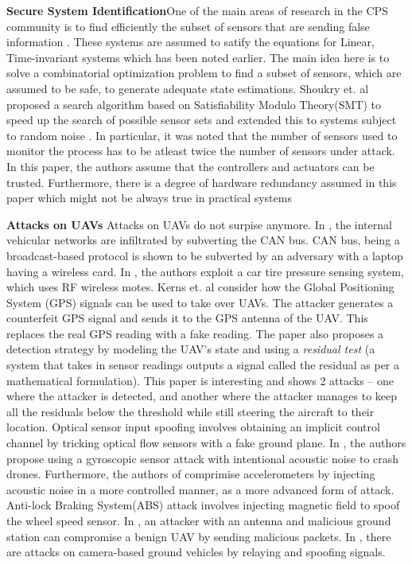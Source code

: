 \textbf{Secure System Identification}One of the main areas of research in the CPS community is to find efficiently the subset of sensors that are sending false information \cite{}. These systems are assumed to satify the equations for Linear, Time-invariant systems which has been noted earlier. The main idea here is to solve a combinatorial optimization problem to find a subset of sensors, which are assumed to be safe, to generate adequate state estimations. Shoukry et. al \cite{} proposed a search algorithm based on Satisfiability Modulo Theory(SMT) to speed up the search of possible sensor sets and extended this to systems subject to random noise \cite{}. In particular, it was noted that the number of sensors used to monitor the process has to be atleast twice the number of sensors under attack. In this paper, the authors  assume that the controllers and actuators can be trusted. Furthermore, there is a degree of hardware redundancy assumed in this paper which might not be always true in practical systems

\textbf{Attacks on UAVs} Attacks on UAVs do not surpise anymore. In \cite{}, the internal vehicular networks are infiltrated by subverting the CAN bus. CAN bus, being a broadcast-based protocol is shown to be subverted by an adversary with a laptop having a wireless card. In \cite{}, the authors exploit a car tire pressure sensing system, which uses RF wireless motes. Kerns et. al \cite{} consider how the Global Positioning System (GPS) signals can be used to take over UAVs. The attacker generates a counterfeit GPS signal and sends it to the GPS antenna of the UAV. This replaces the real GPS reading with a fake reading. The paper also proposes a detection strategy by modeling the UAV's state and using a \textit{residual test} (a system that takes in sensor readings outputs a signal called the residual as per a mathematical formulation). This paper is interesting and shows 2 attacks -- one where the attacker is detected, and another where the attacker manages to keep all the residuals below the threshold while still steering the aircraft to their location. Optical sensor input spoofing \cite{} involves obtaining an implicit control channel by tricking optical flow sensors with a fake ground plane. In \cite{}, the authors propose using a gyroscopic sensor attack with intentional acoustic noise to crash drones. Furthermore, the authors of \cite{} comprimise accelerometers by injecting acoustic noise in a more controlled manner, as a more advanced form of attack. Anti-lock Braking System(ABS) attack \cite{} involves injecting magnetic field to spoof the wheel speed sensor. In \cite{}, an attacker with an antenna and malicious ground station can compromise a benign UAV by sending malicious packets. In \cite{}, there are attacks on camera-based ground vehicles by relaying and spoofing signals.


